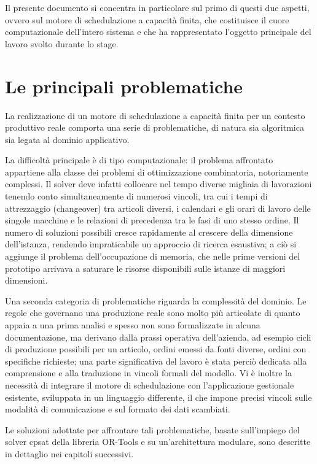 Il presente documento si concentra in particolare sul primo di questi due aspetti, ovvero sul motore di schedulazione a capacità finita, che costituisce il cuore computazionale dell'intero sistema e che ha rappresentato l'oggetto principale del lavoro svolto durante lo stage.

\section{Le principali problematiche}
La realizzazione di un motore di schedulazione a capacità finita per un contesto produttivo reale comporta una serie di problematiche, di natura sia algoritmica sia legata al dominio applicativo.

La difficoltà principale è di tipo computazionale: il problema affrontato appartiene alla classe dei problemi di ottimizzazione combinatoria, notoriamente complessi. Il solver deve infatti collocare nel tempo diverse migliaia di lavorazioni tenendo conto simultaneamente di numerosi vincoli, tra cui i tempi di attrezzaggio (\gls{changeover}) tra articoli diversi, i calendari e gli orari di lavoro delle singole macchine e le relazioni di precedenza tra le fasi di uno stesso ordine. Il numero di soluzioni possibili cresce rapidamente al crescere della dimensione dell'istanza, rendendo impraticabile un approccio di ricerca esaustiva; a ciò si aggiunge il problema dell'occupazione di memoria, che nelle prime versioni del prototipo arrivava a saturare le risorse disponibili sulle istanze di maggiori dimensioni.

Una seconda categoria di problematiche riguarda la complessità del dominio. Le regole che governano una produzione reale sono molto più articolate di quanto appaia a una prima analisi e spesso non sono formalizzate in alcuna documentazione, ma derivano dalla prassi operativa dell'azienda, ad esempio cicli di produzione possibili per un articolo, ordini emessi da fonti diverse, ordini con specifiche richieste; una parte significativa del lavoro è stata perciò dedicata alla comprensione e alla traduzione in vincoli formali del modello. Vi è inoltre la necessità di integrare il motore di schedulazione con l'applicazione gestionale esistente, sviluppata in un linguaggio differente, il che impone precisi vincoli sulle modalità di comunicazione e sul formato dei dati scambiati.

Le soluzioni adottate per affrontare tali problematiche, basate sull'impiego del solver \gls{cpsat} della libreria OR-Tools e su un'architettura modulare, sono descritte in dettaglio nei capitoli successivi.

